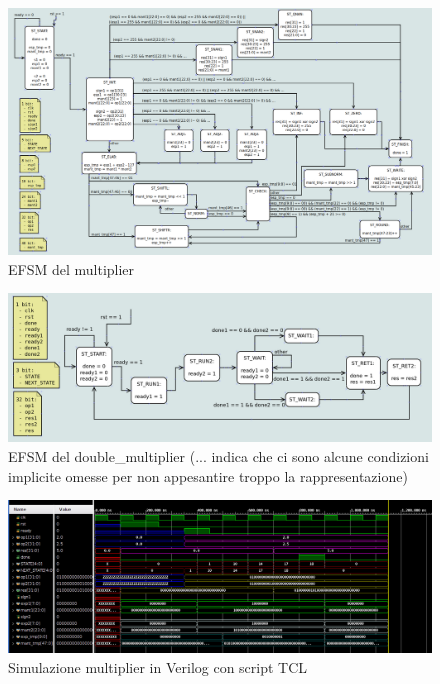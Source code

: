 \documentclass[]{IEEEtran}
\begin{document}
\begin{figure}[bt]
    \centering
    \includegraphics[width=\textwidth]{figures/EFSM_mult}
    \caption{EFSM del multiplier}
    \label{fig:EFSM_MULT}
\end{figure}

\begin{figure}[bt]
    \centering
    \includegraphics[width=\textwidth]{figures/EFSM_dm}
    \caption{EFSM del double\_multiplier (... indica che ci sono alcune condizioni implicite omesse per non appesantire troppo la rappresentazione)}
    \label{fig:EFSM_DM}
\end{figure}

\begin{figure}[bt]
    \centering
    \includegraphics[width=\textwidth]{figures/sim_mult_verilog}
    \caption{Simulazione multiplier in Verilog con script TCL}
    \label{fig:SIM_MULT_VERILOG}
\end{figure}
\end{document}
